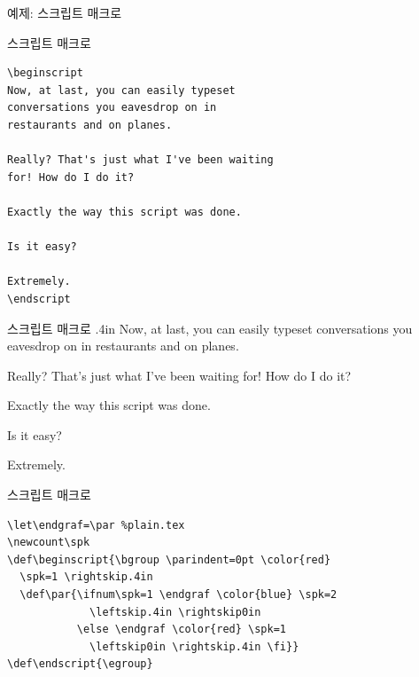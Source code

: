 \documentclass{beamer}
\begin{document}
%
\begin{frame}[standout]
  예제: 스크립트 매크로
\end{frame}


%
\begin{frame}[fragile]{스크립트 매크로}
\begin{Verbatim}[fontsize=\small]
\beginscript
Now, at last, you can easily typeset
conversations you eavesdrop on in
restaurants and on planes.
  
Really? That's just what I've been waiting
for! How do I do it?
  
Exactly the way this script was done.
  
Is it easy?
  
Extremely.
\endscript
\end{Verbatim}
\end{frame}


%
\newcount\spk
\def\beginscript{\bgroup \parindent=0pt \color{red} \spk=1 \rightskip.4in
  \def\par{\ifnum\spk=1 \endgraf \color{blue} \spk=2 \leftskip.4in
    \rightskip0in
    \else \endgraf \color{red} \spk=1 \leftskip0in \rightskip.4in \fi}}
\def\endscript {\egroup}

\begin{frame}[fragile]{스크립트 매크로}
  \hsize 3in
  \beginscript
  Now, at last, you can easily typeset
  conversations you eavesdrop on in
  restaurants and on planes.
  
  Really? That's just what I've been waiting
  for! How do I do it?
  
  Exactly the way this script was done.
  
  Is it easy?
  
  Extremely.
  \endscript
\end{frame}


%
\begin{frame}[fragile]{스크립트 매크로}
\begin{Verbatim}[fontsize=\small]
\let\endgraf=\par %plain.tex 
\newcount\spk
\def\beginscript{\bgroup \parindent=0pt \color{red}
  \spk=1 \rightskip.4in
  \def\par{\ifnum\spk=1 \endgraf \color{blue} \spk=2
             \leftskip.4in \rightskip0in
           \else \endgraf \color{red} \spk=1
             \leftskip0in \rightskip.4in \fi}}
\def\endscript{\egroup}
\end{Verbatim}
\end{frame}
\end{document}
